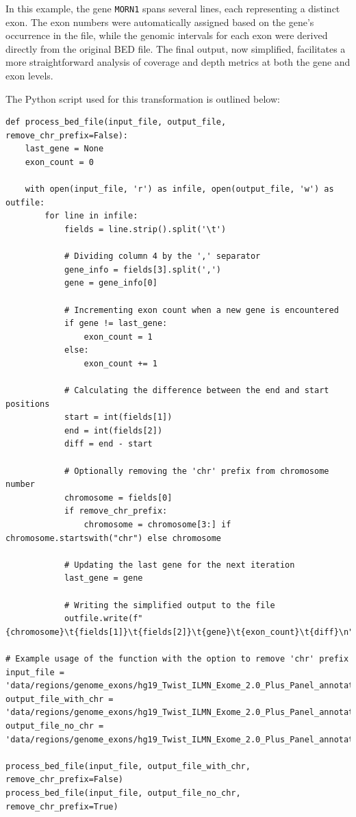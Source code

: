 In this example, the gene \texttt{MORN1} spans several lines, each representing a distinct exon. The exon numbers were automatically assigned based on the gene's occurrence in the file, while the genomic intervals for each exon were derived directly from the original BED file. The final output, now simplified, facilitates a more straightforward analysis of coverage and depth metrics at both the gene and exon levels.

The Python script used for this transformation is outlined below:

\begin{longlisting}
\begin{verbatim}
def process_bed_file(input_file, output_file, remove_chr_prefix=False):
    last_gene = None
    exon_count = 0
    
    with open(input_file, 'r') as infile, open(output_file, 'w') as outfile:
        for line in infile:
            fields = line.strip().split('\t')
            
            # Dividing column 4 by the ',' separator
            gene_info = fields[3].split(',')
            gene = gene_info[0]
            
            # Incrementing exon count when a new gene is encountered
            if gene != last_gene:
                exon_count = 1
            else:
                exon_count += 1
            
            # Calculating the difference between the end and start positions
            start = int(fields[1])
            end = int(fields[2])
            diff = end - start
            
            # Optionally removing the 'chr' prefix from chromosome number
            chromosome = fields[0]
            if remove_chr_prefix:
                chromosome = chromosome[3:] if chromosome.startswith("chr") else chromosome
            
            # Updating the last gene for the next iteration
            last_gene = gene
            
            # Writing the simplified output to the file
            outfile.write(f"{chromosome}\t{fields[1]}\t{fields[2]}\t{gene}\t{exon_count}\t{diff}\n")

# Example usage of the function with the option to remove 'chr' prefix
input_file = 'data/regions/genome_exons/hg19_Twist_ILMN_Exome_2.0_Plus_Panel_annotated.BED'
output_file_with_chr = 'data/regions/genome_exons/hg19_Twist_ILMN_Exome_2.0_Plus_Panel_annotated_modif.bed'
output_file_no_chr = 'data/regions/genome_exons/hg19_Twist_ILMN_Exome_2.0_Plus_Panel_annotated_modif_nochr.bed'

process_bed_file(input_file, output_file_with_chr, remove_chr_prefix=False)
process_bed_file(input_file, output_file_no_chr, remove_chr_prefix=True)
\end{verbatim}
\end{longlisting}

